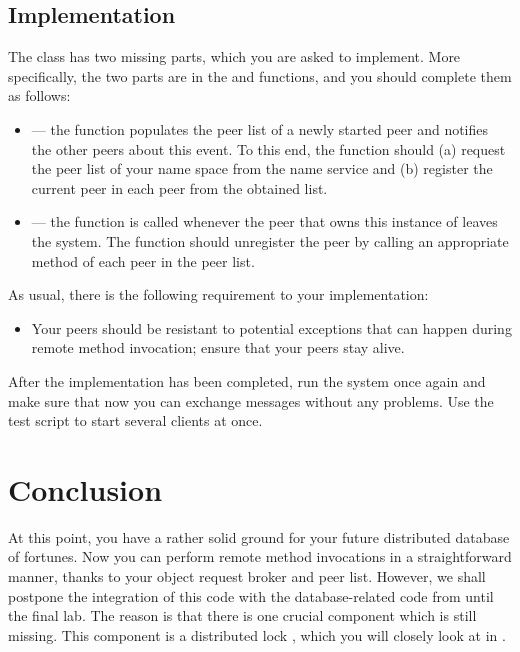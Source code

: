 \documentclass[a4paper]{article}
\begin{document}
\subsection{Implementation}
The  class has two missing parts, which you are asked to
implement. More specifically, the two parts are in the  and
 functions, and you should complete them as follows:
\begin{itemize}

  \item {} --- the function populates the peer list of a newly
  started peer and notifies the other peers about this event. To this end, the
  function should (a) request the peer list of your name space from the name
  service and (b) register the current peer in each peer from the obtained list.

  \item {} --- the function is called whenever the peer that owns
  this instance of  leaves the system. The function should
  unregister the peer by calling an appropriate method of each peer in the peer
  list.

\end{itemize}
As usual, there is the following requirement to your implementation:
\begin{itemize}

  \item Your peers should be resistant to potential exceptions that can happen
  during remote method invocation; ensure that your peers stay alive.

\end{itemize}
After the implementation has been completed, run the system once again and make
sure that now you can exchange messages without any problems. Use the test
script to start several clients at once.

\section{Conclusion}
At this point, you have a rather solid ground for your future distributed
database of fortunes. Now you can perform remote method invocations in a
straightforward manner, thanks to your object request broker and peer list.
However, we shall postpone the integration of this code with the
database-related code from  until the final lab. The reason is that
there is one crucial component which is still missing. This component is a
distributed lock \cite{lecture67}, which you will closely look at in .

\printbibliography
\end{document}

